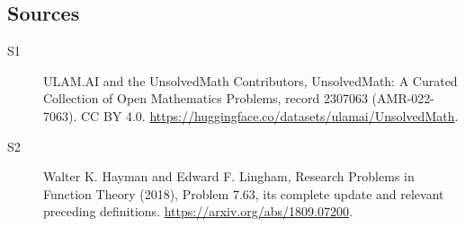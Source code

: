 \documentclass[11pt]{article}
\begin{document}
\subsection{Sources}
\begin{description}
\item[\hypertarget{source:2307063:1}{S1}] ULAM.AI and the UnsolvedMath Contributors, UnsolvedMath: A Curated Collection of Open Mathematics Problems, record 2307063 (AMR-022-7063). CC BY 4.0. \url{https://huggingface.co/datasets/ulamai/UnsolvedMath}.
\item[\hypertarget{source:2307063:2}{S2}] Walter K. Hayman and Edward F. Lingham, Research Problems in Function Theory (2018), Problem 7.63, its complete update and relevant preceding definitions. \url{https://arxiv.org/abs/1809.07200}.
\end{description}
\label{end:2307063}
\end{document}

